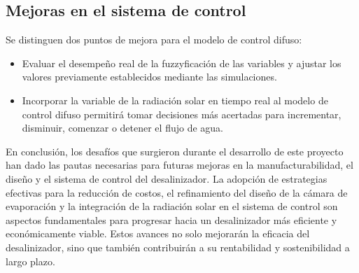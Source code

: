 		\subsection{Mejoras en el sistema de control}
			
			Se distinguen dos puntos de mejora para el modelo de control difuso:
			
			\begin{itemize}
				\item Evaluar el desempeño real de la fuzzyficación de las variables y ajustar los valores previamente establecidos mediante las simulaciones.
				\item Incorporar la variable de la radiación solar en tiempo real al modelo de control difuso permitirá tomar decisiones más acertadas para incrementar, disminuir, comenzar o detener el flujo de agua.
			\end{itemize}
		
		
		En conclusión, los desafíos que surgieron durante el desarrollo de este proyecto han dado las pautas necesarias para futuras mejoras en la manufacturabilidad, el diseño y el sistema de control del desalinizador. La adopción de estrategias efectivas para la reducción de costos, el refinamiento del diseño de la cámara de evaporación y la integración de la radiación solar en el sistema de control son aspectos fundamentales para progresar hacia un desalinizador más eficiente y económicamente viable. Estos avances no solo mejorarán la eficacia del desalinizador, sino que también contribuirán a su rentabilidad y sostenibilidad a largo plazo.

			
			